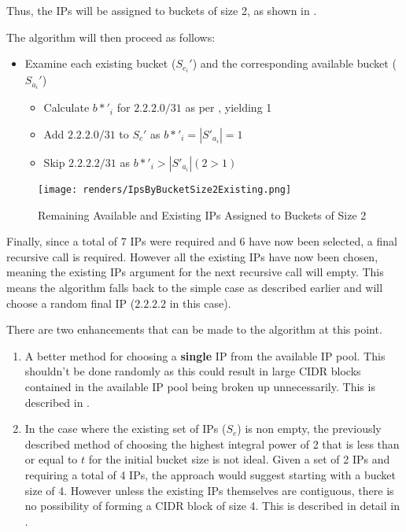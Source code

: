 Thus, the IPs will be assigned to buckets of size 2, as shown in .

The algorithm will then proceed as follows:
\begin{itemize}
\item{Examine each existing bucket ($S_{e_i}'$) and the corresponding available bucket ($S_{a_i}'$)}
\begin{itemize}
\item{Calculate $b*'_i$ for $2.2.2.0/31$ as per , yielding 1}
\item{Add $2.2.2.0/31$ to $S_c'$ as $b*'_i = |S'_{a_i}| = 1$} 
\item{Skip $2.2.2.2/31$ as $b*'_i > |S'_{a_i}| (2 > 1)$}
\end{itemize}
\end{itemize}

\begin{figure}[H]
      \centering
      \texttt{[image: renders/IpsByBucketSize2Existing.png]}
      \caption{Remaining Available and Existing IPs Assigned to Buckets of Size 2}
      \label{fig:ipsByBucketExisting2}
\end{figure}

Finally, since a total of 7 IPs were required and 6 have now been selected, a final recursive call is required. However all the existing IPs have now been chosen, meaning the existing IPs argument for the next recursive call will empty. This means the algorithm falls back to the simple case as described earlier and will choose a random final IP ($2.2.2.2$ in this case). 

There are two enhancements that can be made to the algorithm at this point.

\begin{enumerate}
\item{A better method for choosing a \textbf{single} IP from the available IP pool. This shouldn't be done randomly as this could result in large CIDR blocks contained in the available IP pool being broken up unnecessarily. This is described in .}
\item{In the case where the existing set of IPs ($S_e$) is non empty, the previously described method of choosing the highest integral power of 2 that is less than or equal to $t$ for the initial bucket size is not ideal. Given a set of 2 IPs and requiring a total of 4 IPs, the approach would suggest starting with a bucket size of 4. However unless the existing IPs themselves are contiguous, there is no possibility of forming a CIDR block of size 4. This is described in detail in .}
\end{enumerate}

